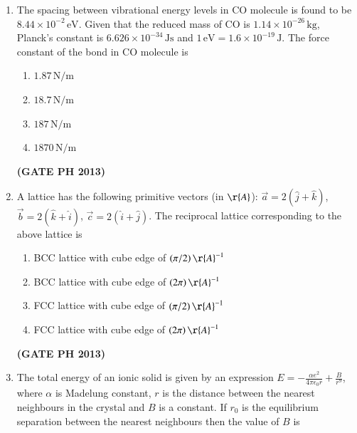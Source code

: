 \documentclass[14pt, a4paper]{extarticle}
\renewcommand{\vec}[1]{\overrightarrow{#1}}
\begin{document}
\begin{enumerate}[label=\textbf{Q. \arabic*}]
\item The spacing between vibrational energy levels in CO molecule is found to be $8.44 \times 10^{-2}\,\text{eV}$. Given that the reduced mass of CO is $1.14 \times 10^{-26}\,\text{kg}$, Planck's constant is $6.626 \times 10^{-34}\,\text{Js}$ and $1\,\text{eV} = 1.6 \times 10^{-19}\,\text{J}$. The force constant of the bond in CO molecule is
\begin{multicols}{4}
    \begin{enumerate}
        \item $1.87\,\text{N/m}$
        \item $18.7\,\text{N/m}$
        \item $187\,\text{N/m}$
        \item $1870\,\text{N/m}$
    \end{enumerate}
\end{multicols}
\hfill \textbf{(GATE PH 2013)}

\item A lattice has the following primitive vectors (in $\r{A}$): $\vec{a} = 2(\hat{j} + \hat{k})$, $\vec{b} = 2(\hat{k} + \hat{i})$, $\vec{c} = 2(\hat{i} + \hat{j})$. The reciprocal lattice corresponding to the above lattice is
\begin{enumerate}
    \item BCC lattice with cube edge of $(\pi/2)\,\r{A}^{-1}$
    \item BCC lattice with cube edge of $(2\pi)\,\r{A}^{-1}$
    \item FCC lattice with cube edge of $(\pi/2)\,\r{A}^{-1}$
    \item FCC lattice with cube edge of $(2\pi)\,\r{A}^{-1}$
\end{enumerate}
\hfill \textbf{(GATE PH 2013)}

\item The total energy of an ionic solid is given by an expression $E = -\frac{\alpha e^2}{4\pi\epsilon_0 r} + \frac{B}{r^9}$, where $\alpha$ is Madelung constant, $r$ is the distance between the nearest neighbours in the crystal and $B$ is a constant. If $r_0$ is the equilibrium separation between the nearest neighbours then the value of $B$ is
\begin{enumerate}
\end{enumerate}


\end{enumerate}
\end{document}
